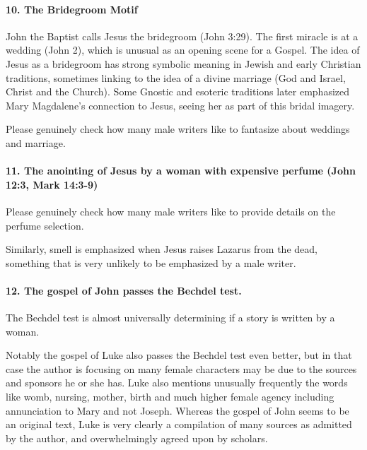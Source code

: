 \paragraph{10.
The Bridegroom Motif}\label{par:the-bridegroom-motif}

John the Baptist calls Jesus the bridegroom (John 3:29).
The first miracle is at a wedding (John 2), which is unusual as an opening scene for a Gospel.
The idea of Jesus as a bridegroom has strong symbolic meaning in Jewish and early Christian traditions, sometimes linking to the idea of a divine marriage (God and Israel, Christ and the Church).
Some Gnostic and esoteric traditions later emphasized Mary Magdalene's connection to Jesus, seeing her as part of this bridal imagery.

Please genuinely check how many male writers like to fantasize about weddings and marriage.

\paragraph{11.
The anointing of Jesus by a woman with expensive perfume (John 12:3, Mark 14:3-9)}\label{par:the-anointing-of-jesus-by-a-woman-with-expensive-perfume-john-123-mark-143-9}

Please genuinely check how many male writers like to provide details on the perfume selection.

Similarly, smell is emphasized when Jesus raises Lazarus from the dead, something that is very unlikely to be emphasized by a male writer.

\paragraph{12.
The gospel of John passes the Bechdel test.}\label{par:the-gospel-of-john-passes-the-bechdel-test.}

The Bechdel test is almost universally determining if a story is written by a woman.

Notably the gospel of Luke also passes the Bechdel test even better, but in that case the author is focusing on many female characters may be due to the sources and sponsors he or she has.
Luke also mentions unusually frequently the words like womb, nursing, mother, birth and much higher female agency including annunciation to Mary and not Joseph.
Whereas the gospel of John seems to be an original text, Luke is very clearly a compilation of many sources as admitted by the author, and overwhelmingly agreed upon by scholars.

